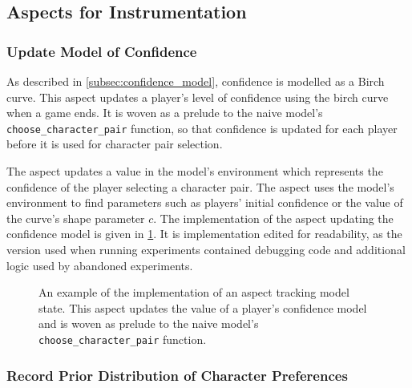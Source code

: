 \subsection{Aspects for Instrumentation}\label{subsec:aspects_instrumenting_model}

\subsubsection{Update Model of Confidence}
\label{confidence_model_aspect_impl_writeup}

As described in \cref{subsec:confidence_model}, confidence is modelled as a
Birch curve. This aspect updates a player's level of confidence using the birch
curve when a game ends. It is woven as a prelude to the naive model's
\lstinline{choose_character_pair} function, so that confidence is updated for
each player before it is used for character pair selection.

The aspect updates a value in the model's environment which represents the
confidence of the player selecting a character pair. The aspect uses the model's
environment to find parameters such as players' initial confidence or the value
of the curve's shape parameter $c$. The implementation of the aspect updating
the confidence model is given in
\cref{fig:update_confidence_model_aspect_source}. It is implementation
edited for readability, as the version used when running experiments contained
debugging code and additional logic used by abandoned experiments.

\begin{figure}[h]
  \centering
  
  \caption{An example of the implementation of an aspect tracking model state.
  This aspect updates the value of a player's confidence model and is woven as
  prelude to the naive model's \lstinline{choose_character_pair} function.}
  \label{fig:update_confidence_model_aspect_source}
\end{figure}

\subsubsection{Record Prior Distribution of Character Preferences}





